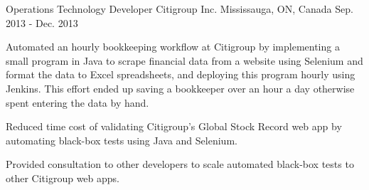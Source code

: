 

\begin{cventries}

  \cventry
    {Operations Technology Developer} %
    {Citigroup Inc.} %
    {Mississauga, ON, Canada} %
    {Sep. 2013 - Dec. 2013} %
    {
      \begin{cvitems} %
        \item {
          Automated an hourly bookkeeping workflow at Citigroup by implementing a small program in
          Java to scrape financial data from a website using Selenium and format the data to Excel
          spreadsheets, and deploying this program hourly using Jenkins. This effort ended up
          saving a bookkeeper over an hour a day otherwise spent entering the data by hand.
        }
        \item {
          Reduced time cost of validating Citigroup's Global Stock Record web app by automating
          black-box tests using Java and Selenium.
        }
        \item {
          Provided consultation to other developers to scale automated black-box tests to
          other Citigroup web apps.
        }
      \end{cvitems}
    }


\end{cventries}
